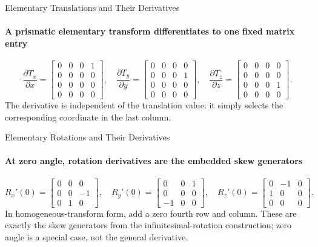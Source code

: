\documentclass[aspectratio=169]{beamer}
\begin{document}
\begin{frame}[t]{Elementary Translations and Their Derivatives}
    \framesubtitle{A prismatic elementary transform differentiates to one fixed matrix entry}
    \[
        \frac{\partial T_x}{\partial x}=
        \begin{bmatrix}0&0&0&1\\0&0&0&0\\0&0&0&0\\0&0&0&0\end{bmatrix},\quad
        \frac{\partial T_y}{\partial y}=
        \begin{bmatrix}0&0&0&0\\0&0&0&1\\0&0&0&0\\0&0&0&0\end{bmatrix},\quad
        \frac{\partial T_z}{\partial z}=
        \begin{bmatrix}0&0&0&0\\0&0&0&0\\0&0&0&1\\0&0&0&0\end{bmatrix}.
    \]
    The derivative is independent of the translation value: it simply selects the corresponding coordinate in the last column.
\end{frame}

\begin{frame}[t]{Elementary Rotations and Their Derivatives}
    \framesubtitle{At zero angle, rotation derivatives are the embedded skew generators}
    \[
        R_x'(0)=
        \begin{bmatrix}0&0&0\\0&0&-1\\0&1&0\end{bmatrix},\quad
        R_y'(0)=
        \begin{bmatrix}0&0&1\\0&0&0\\-1&0&0\end{bmatrix},\quad
        R_z'(0)=
        \begin{bmatrix}0&-1&0\\1&0&0\\0&0&0\end{bmatrix}.
    \]
    In homogeneous-transform form, add a zero fourth row and column. These are exactly the skew generators from the infinitesimal-rotation construction; zero angle is a special case, not the general derivative.
\end{frame}
\end{document}

